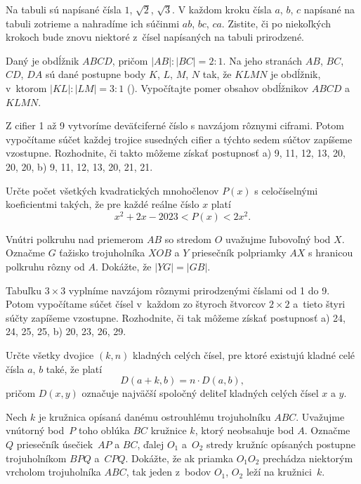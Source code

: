 {%
Na tabuli sú napísané čísla $1$, $\sqrt{2}$, $\sqrt{3}$. V každom kroku čísla $a$, $b$, $c$ napísané na tabuli zotrieme a nahradíme ich súčinmi $ab$, $bc$, $ca$. Zistite, či po niekoľkých krokoch bude znovu niektoré z~čísel napísaných na tabuli prirodzené.}

{%
Daný je obdĺžnik $ABCD$, pričom ${|AB|:|BC|}=2:1$. Na jeho stranách $AB$, $BC$, $CD$, $DA$ sú dané postupne body $K$, $L$, $M$, $N$ tak, že $KLMN$ je obdĺžnik, v~ktorom $|KL|:|LM|=3:1$ (\obr). Vypočítajte pomer obsahov obdĺžnikov $ABCD$ a $KLMN$.
}

{%
Z cifier 1 až 9 vytvoríme deväťciferné číslo s navzájom rôznymi ciframi. Potom vypočítame súčet každej trojice susedných cifier a týchto sedem súčtov zapíšeme vzostupne. Rozhodnite, či takto môžeme získať postupnosť
\ite a) 9, 11, 12, 13, 20, 20, 20,
\ite b) 9, 11, 12, 13, 20, 21, 21.
}

{%
Určte počet všetkých kvadratických mnohočlenov $P(x)$ s celočíselnými koeficientmi takých, že pre každé reálne číslo $x$ platí
$$
x^2 + 2x - 2023 < P(x) < 2x^2.
$$
}

{%
Vnútri polkruhu nad priemerom $AB$ so stredom $O$ uvažujme ľubovoľný bod $X$.
Označme $G$ ťažisko trojuholníka $XOB$ a $Y$ priesečník polpriamky $AX$ s hranicou polkruhu rôzny od $A$.
Dokážte, že $|YG|=|GB|$.}

{%
Tabuľku $3\times 3$ vyplníme navzájom rôznymi prirodzenými číslami od 1 do 9. Potom vypočítame súčet čísel v~každom zo štyroch štvorcov $2\times 2$ a~tieto štyri súčty zapíšeme vzostupne. Rozhodnite, či tak môžeme získať postupnosť
\ite a) 24, 24, 25, 25,
\ite b) 20, 23, 26, 29.
}

{%
Určte všetky dvojice $(k,n)$ kladných celých čísel, pre ktoré existujú kladné celé čísla $a$, $b$ také, že platí
$$
D(a+k, b) = n\cdot D(a, b),
$$
pričom $D(x,y)$ označuje najväčší spoločný deliteľ kladných celých čísel $x$ a $y$.
}

{%
Nech $k$ je kružnica opísaná danému ostrouhlému trojuholníku $ABC$. Uvažujme vnútorný bod~$P$ toho oblúka $BC$ kružnice $k$, ktorý neobsahuje bod $A$. Označme $Q$ priesečník úsečiek~$AP$ a $BC$, ďalej $O_1$ a~$O_2$ stredy kružníc opísaných postupne trojuholníkom $BPQ$ a~$CPQ$. Dokážte, že ak priamka $O_1O_2$ prechádza niektorým vrcholom trojuholníka $ABC$, tak jeden z~bodov $O_1$, $O_2$ leží na kružnici~$k$.}

